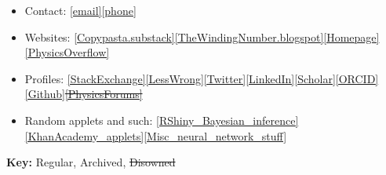 \documentclass{article}
\newcommand{\disown}[1]{\sout{#1}}
\newcommand{\archive}{\color{lightgray}}
\begin{document}
\begin{itemize}
    \item Contact:  \href{mailto:abhimanyupallavisudhir@gmail.com}{[email]}\href{tel:+44-7771824896}{[phone]} %
    \item Websites: \href{https://copypasta.substack.com}{[Copypasta.substack]}\href{https://thewindingnumber.blogspot.com/}{[TheWindingNumber.blogspot]}\href{https://abhimanyu.io/}{[Homepage]}{\archive\href{https://physicsoverflow.org/}{[PhysicsOverflow]}}
    \item Profiles: \href{https://math.stackexchange.com/users/78451/abhimanyu-pallavi-sudhir}{[StackExchange]}\href{https://www.lesswrong.com/users/abhimanyu-pallavi-sudhir}{[LessWrong]}\href{https://twitter.com/abhimanyupasu}{[Twitter]}\href{https://www.linkedin.com/in/abhimanyu-pallavi-sudhir/}{[LinkedIn]}\href{https://scholar.google.com/citations?user=lb38BjYAAAAJ&hl=en}{[Scholar]}\href{https://orcid.org/0000-0002-2506-0515}{[ORCID]}{\archive\href{https://github.com/abhimanyupallavisudhir/}{[Github]}\disown{\href{https://www.physicsforums.com/members/dimension10}{[PhysicsForums]}}}
    \item {\archive Random applets and such: \href{https://abhimanyups.shinyapps.io/BayesianInference/}{[RShiny\_Bayesian\_inference]}\href{https://www.khanacademy.org/profile/abhimanyupallavisudhir/projects}{[KhanAcademy\_applets]}\href{https://thewindingnumber.blogspot.com/p/blog.html}{[Misc\_neural\_network\_stuff]}}
\end{itemize}

\vspace{1em}

\textbf{Key:} Regular, {\archive Archived}, {\archive \disown{Disowned}}
\end{document}
